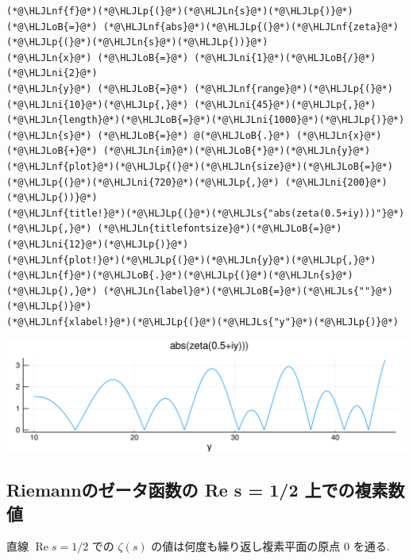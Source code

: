 \documentclass[12pt,a4paper,xelatex,ja=standard]{bxjsarticle}
\newcommand{\HLJLn}[1]{#1}
\newcommand{\HLJLnf}[1]{\textcolor[RGB]{66,102,213}{#1}}
\newcommand{\HLJLs}[1]{\textcolor[RGB]{201,61,57}{#1}}
\newcommand{\HLJLni}[1]{\textcolor[RGB]{59,151,46}{#1}}
\newcommand{\HLJLoB}[1]{\textcolor[RGB]{102,102,102}{\textbf{#1}}}
\newcommand{\HLJLp}[1]{#1}
\newcommand\real{\operatorname{Re}}
\begin{document}
\begin{lstlisting}
(*@\HLJLnf{f}@*)(*@\HLJLp{(}@*)(*@\HLJLn{s}@*)(*@\HLJLp{)}@*) (*@\HLJLoB{=}@*) (*@\HLJLnf{abs}@*)(*@\HLJLp{(}@*)(*@\HLJLnf{zeta}@*)(*@\HLJLp{(}@*)(*@\HLJLn{s}@*)(*@\HLJLp{))}@*)
(*@\HLJLn{x}@*) (*@\HLJLoB{=}@*) (*@\HLJLni{1}@*)(*@\HLJLoB{/}@*)(*@\HLJLni{2}@*)
(*@\HLJLn{y}@*) (*@\HLJLoB{=}@*) (*@\HLJLnf{range}@*)(*@\HLJLp{(}@*)(*@\HLJLni{10}@*)(*@\HLJLp{,}@*) (*@\HLJLni{45}@*)(*@\HLJLp{,}@*) (*@\HLJLn{length}@*)(*@\HLJLoB{=}@*)(*@\HLJLni{1000}@*)(*@\HLJLp{)}@*)
(*@\HLJLn{s}@*) (*@\HLJLoB{=}@*) @(*@\HLJLoB{.}@*) (*@\HLJLn{x}@*) (*@\HLJLoB{+}@*) (*@\HLJLn{im}@*)(*@\HLJLoB{*}@*)(*@\HLJLn{y}@*)
(*@\HLJLnf{plot}@*)(*@\HLJLp{(}@*)(*@\HLJLn{size}@*)(*@\HLJLoB{=}@*)(*@\HLJLp{(}@*)(*@\HLJLni{720}@*)(*@\HLJLp{,}@*) (*@\HLJLni{200}@*)(*@\HLJLp{))}@*)
(*@\HLJLnf{title!}@*)(*@\HLJLp{(}@*)(*@\HLJLs{"abs(zeta(0.5+iy)))"}@*)(*@\HLJLp{,}@*) (*@\HLJLn{titlefontsize}@*)(*@\HLJLoB{=}@*)(*@\HLJLni{12}@*)(*@\HLJLp{)}@*)
(*@\HLJLnf{plot!}@*)(*@\HLJLp{(}@*)(*@\HLJLn{y}@*)(*@\HLJLp{,}@*) (*@\HLJLn{f}@*)(*@\HLJLoB{.}@*)(*@\HLJLp{(}@*)(*@\HLJLn{s}@*)(*@\HLJLp{),}@*) (*@\HLJLn{label}@*)(*@\HLJLoB{=}@*)(*@\HLJLs{""}@*)(*@\HLJLp{)}@*)
(*@\HLJLnf{xlabel!}@*)(*@\HLJLp{(}@*)(*@\HLJLs{"y"}@*)(*@\HLJLp{)}@*)
\end{lstlisting}


\begin{center}
\includegraphics[width=0.8\linewidth]{figures/テスト_7_1.pdf}
\end{center}

\subsection{Riemannのゼータ函数の Re s = 1/2 上での複素数値}
直線 $\real s = 1/2$ での $\zeta(s)$ の値は何度も繰り返し複素平面の原点 $0$ を通る.
\end{document}
